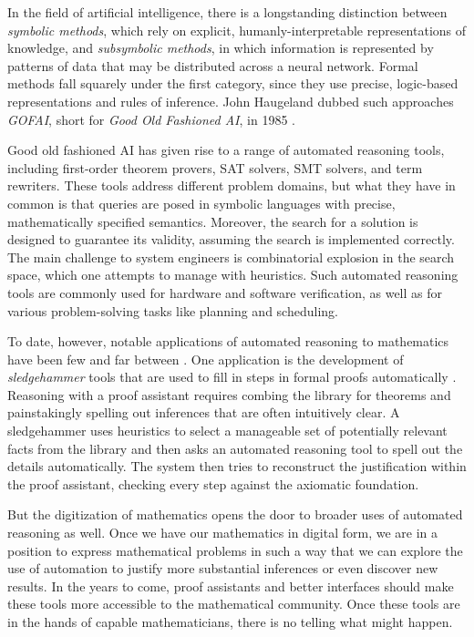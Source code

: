 \documentclass[12pt]{amsart}
\theoremstyle{definition}
\theoremstyle{remark}
\numberwithin{equation}{section}
\begin{document}
In the field of artificial intelligence, there is a longstanding distinction between \emph{symbolic methods}, which rely on explicit, humanly-interpretable representations of knowledge, and \emph{subsymbolic methods}, in which information is represented by patterns of data that may be distributed across a neural network. Formal methods fall squarely under the first category, since they use precise, logic-based representations and rules of inference. John Haugeland dubbed such approaches \emph{GOFAI}, short for \emph{Good Old Fashioned AI}, in 1985 \cite{haugeland:85}.

Good old fashioned AI has given rise to a range of automated reasoning tools, including first-order theorem provers, SAT solvers, SMT solvers, and term rewriters. These tools address different problem domains, but what they have in common is that queries are posed in symbolic languages with precise, mathematically specified semantics. Moreover, the search for a solution is designed to guarantee its validity, assuming the search is implemented correctly. The main challenge to system engineers is combinatorial explosion in the search space, which one attempts to manage with heuristics. Such automated reasoning tools are commonly used for hardware and software verification, as well as for various problem-solving tasks like planning and scheduling.

To date, however, notable applications of automated reasoning to mathematics have been few and far between \cite{avigad:18,heule:kullmann:17}. One application is the development of \emph{sledgehammer} tools that are used to fill in steps in formal proofs automatically \cite{desharnais:et:al:22}. Reasoning with a proof assistant requires combing the library for theorems and painstakingly spelling out inferences that are often intuitively clear. A sledgehammer uses heuristics to select a manageable set of potentially relevant facts from the library and then asks an automated reasoning tool to spell out the details automatically. The system then tries to reconstruct the justification within the proof assistant, checking every step against the axiomatic foundation.

But the digitization of mathematics opens the door to broader uses of automated reasoning as well. Once we have our mathematics in digital form, we are in a position to express mathematical problems in such a way that we can explore the use of automation to justify more substantial inferences or even discover new results. In the years to come, proof assistants and better interfaces should make these tools more accessible to the mathematical community. Once these tools are in the hands of capable mathematicians, there is no telling what might happen.
\end{document}
